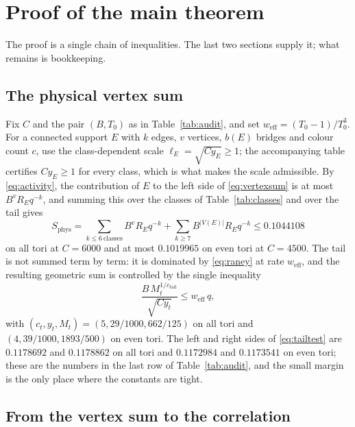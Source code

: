 \documentclass[11pt]{article}
\theoremstyle{plain}
\theoremstyle{definition}
\begin{document}
\section{Proof of the main theorem}\label{sec:proof}

The proof is a single chain of inequalities. The last two sections supply it; what
remains is bookkeeping.

\subsection{The physical vertex sum}

Fix $C$ and the pair $(B,T_0)$ as in Table~\ref{tab:audit}, and set
$w_{\mathrm{eff}}=(T_0-1)/T_0^{3}$. For a connected support $E$ with $k$ edges,
$v$ vertices, $b(E)$ bridges and colour count $c$, use the class-dependent scale
$\ell_E=\sqrt{Cy_E}\ge1$; the accompanying table certifies $Cy_E\ge1$ for every
class, which is what makes the scale admissible. By \eqref{eq:activity}, the
contribution of $E$ to the left side of \eqref{eq:vertexsum} is at most
$B^{v}R_Eq^{-k}$, and summing this over the classes of Table~\ref{tab:classes} and
over the tail gives
\begin{equation}\label{eq:physsum}
S_{\mathrm{phys}}=\sum_{k\le6\ \text{classes}}B^{v}R_Eq^{-k}
+\sum_{k\ge7}B^{|V(E)|}R_Eq^{-k}\le0.1044108
\end{equation}
on all tori at $C=6000$ and at most $0.1019965$ on even tori at $C=4500$. The tail is
not summed term by term: it is dominated by \eqref{eq:raney} at rate
$w_{\mathrm{eff}}$, and the resulting geometric sum is controlled by the single
inequality
\begin{equation}\label{eq:tailtest}
\frac{B\,M_t^{1/c_{\mathrm{tail}}}}{\sqrt{Cy_t}}
\le w_{\mathrm{eff}}\,q,
\end{equation}
with $(c_t,y_t,M_t)=(5,29/1000,662/125)$ on all tori and
$(4,39/1000,1893/500)$ on even tori. The left and right sides of \eqref{eq:tailtest}
are $0.1178692$ and $0.1178862$ on all tori and $0.1172984$ and $0.1173541$ on even
tori; these are the numbers in the last row of Table~\ref{tab:audit}, and the small
margin is the only place where the constants are tight.

\subsection{From the vertex sum to the correlation}
\end{document}
